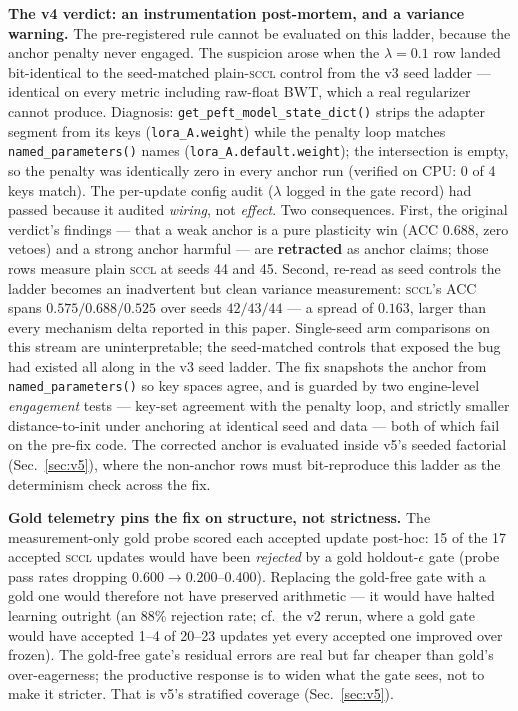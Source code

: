 \documentclass[10pt,conference]{IEEEtran}
\begin{document}
\textbf{The v4 verdict: an instrumentation post-mortem, and a variance warning.} The pre-registered rule cannot be evaluated on this ladder, because the anchor penalty never engaged. The suspicion arose when the $\lambda{=}0.1$ row landed bit-identical to the seed-matched plain-\textsc{sccl} control from the v3 seed ladder --- identical on every metric including raw-float BWT, which a real regularizer cannot produce. Diagnosis: \texttt{get\_peft\_model\_state\_dict()} strips the adapter segment from its keys (\texttt{lora\_A.weight}) while the penalty loop matches \texttt{named\_parameters()} names (\texttt{lora\_A.default.weight}); the intersection is empty, so the penalty was identically zero in every anchor run (verified on CPU: 0 of 4 keys match). The per-update config audit ($\lambda$ logged in the gate record) had passed because it audited \emph{wiring}, not \emph{effect}. Two consequences. First, the original verdict's findings --- that a weak anchor is a pure plasticity win (ACC $0.688$, zero vetoes) and a strong anchor harmful --- are \textbf{retracted} as anchor claims; those rows measure plain \textsc{sccl} at seeds 44 and 45. Second, re-read as seed controls the ladder becomes an inadvertent but clean variance measurement: \textsc{sccl}'s ACC spans $0.575 / 0.688 / 0.525$ over seeds $42/43/44$ --- a spread of $0.163$, larger than every mechanism delta reported in this paper. Single-seed arm comparisons on this stream are uninterpretable; the seed-matched controls that exposed the bug had existed all along in the v3 seed ladder. The fix snapshots the anchor from \texttt{named\_parameters()} so key spaces agree, and is guarded by two engine-level \emph{engagement} tests --- key-set agreement with the penalty loop, and strictly smaller distance-to-init under anchoring at identical seed and data --- both of which fail on the pre-fix code. The corrected anchor is evaluated inside v5's seeded factorial (Sec.~\ref{sec:v5}), where the non-anchor rows must bit-reproduce this ladder as the determinism check across the fix.

\textbf{Gold telemetry pins the fix on structure, not strictness.} The measurement-only gold probe scored each accepted update post-hoc: 15 of the 17 accepted \textsc{sccl} updates would have been \emph{rejected} by a gold holdout-$\epsilon$ gate (probe pass rates dropping $0.600 \to 0.200$--$0.400$). Replacing the gold-free gate with a gold one would therefore not have preserved arithmetic --- it would have halted learning outright (an 88\% rejection rate; cf.\ the v2 rerun, where a gold gate would have accepted 1--4 of 20--23 updates yet every accepted one improved over frozen). The gold-free gate's residual errors are real but far cheaper than gold's over-eagerness; the productive response is to widen what the gate sees, not to make it stricter. That is v5's stratified coverage (Sec.~\ref{sec:v5}).
\end{document}
